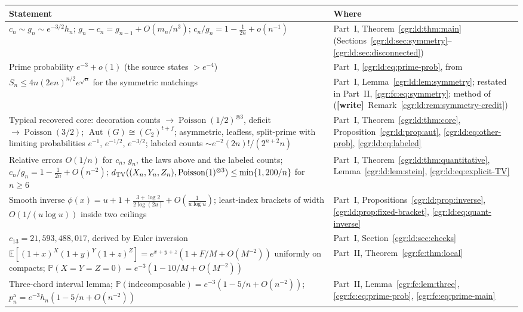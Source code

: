 \documentclass[11pt,letterpaper]{article}
\numberwithin{equation}{section}
\theoremstyle{definition}\newtheorem{definition}[theorem]{Definition}
\theoremstyle{remark}\newtheorem{remark}[theorem]{Remark}
\newcommand{\PP}{\mathbb P}
\newcommand{\EE}{\mathbb E}
\DeclareMathOperator{\Aut}{Aut}
\DeclareMathOperator{\Poi}{Poisson}
\newcommand{\wtag}{\textup{\textbf{[write]}}}
\begin{document}
\begin{center}
\small
\begin{tabular}{@{}>{\raggedright\arraybackslash}p{} >{\raggedright\arraybackslash}p{}@{}}
\toprule
Statement & Where\\
\midrule
$c_n\sim g_n\sim e^{-3/2}h_n$; $g_n-c_n=g_{n-1}+O(m_n/n^3)$; $c_n/g_n=1-\frac1{2n}+o(n^{-1})$ & Part~I, Theorem~\ref{cgr:ld:thm:main} (Sections~\ref{cgr:ld:sec:symmetry}--\ref{cgr:ld:sec:disconnected})\\
Prime probability $e^{-3}+o(1)$ (the source states $>e^{-4}$) & Part~I, \eqref{cgr:ld:eq:prime-prob}, from \cite[Lemmas 5.7--5.10]{BBFGP24}\\
$S_n\le4n(2en)^{n/2}e^{\sqrt n}$ for the symmetric matchings & Part~I, Lemma~\ref{cgr:ld:lem:symmetry}; restated in Part~II, \eqref{cgr:fc:eq:symmetry}; method of \cite[Proposition 5.14]{BBFGP24} (\wtag\ Remark~\ref{cgr:ld:rem:symmetry-credit})\\
Typical recovered core: decoration counts $\to\Poi(1/2)^{\otimes3}$, deficit $\to\Poi(3/2)$; $\Aut(G)\cong(C_2)^{t+f}$; asymmetric, leafless, split-prime with limiting probabilities $e^{-1}$, $e^{-1/2}$, $e^{-3/2}$; labeled counts $\sim e^{-2}(2n)!/(2^{n+2}n)$ & Part~I, Theorem~\ref{cgr:ld:thm:core}, Proposition~\ref{cgr:ld:prop:aut}, \eqref{cgr:ld:eq:other-prob}, \eqref{cgr:ld:eq:labeled}\\
Relative errors $O(1/n)$ for $c_n$, $g_n$, the laws above and the labeled counts; $c_n/g_n=1-\frac1{2n}+O(n^{-2})$; $d_{\rm TV}((X_n,Y_n,Z_n),\Poi(1)^{\otimes3})\le\min\{1,200/n\}$ for $n\ge6$ & Part~I, Theorem~\ref{cgr:ld:thm:quantitative}, Lemma~\ref{cgr:ld:lem:stein}, \eqref{cgr:ld:eq:explicit-TV}\\
Smooth inverse $\phi(x)=u+1+\frac{3+\log2}{2\log(2u)}+O(\frac1{u\log u})$; least-index brackets of width $O(1/(u\log u))$ inside two ceilings & Part~I, Propositions~\ref{cgr:ld:prop:inverse}, \ref{cgr:ld:prop:fixed-bracket}, \eqref{cgr:ld:eq:quant-inverse}\\
$c_{13}=21{,}593{,}488{,}017$, derived by Euler inversion & Part~I, Section~\ref{cgr:ld:sec:checks}\\
$\EE[(1+x)^X(1+y)^Y(1+z)^Z]=e^{x+y+z}(1+F/M+O(M^{-2}))$ uniformly on compacts; $\PP(X=Y=Z=0)=e^{-3}(1-10/M+O(M^{-2}))$ & Part~II, Theorem~\ref{cgr:fc:thm:local}\\
Three-chord interval lemma; $\PP(\text{indecomposable})=e^{-3}(1-5/n+O(n^{-2}))$; $p_n^{\mathrm a}=e^{-3}h_n(1-5/n+O(n^{-2}))$ & Part~II, Lemma~\ref{cgr:fc:lem:three}, \eqref{cgr:fc:eq:prime-prob}, \eqref{cgr:fc:eq:prime-main}\\

\end{tabular}
\end{center}
\end{document}
